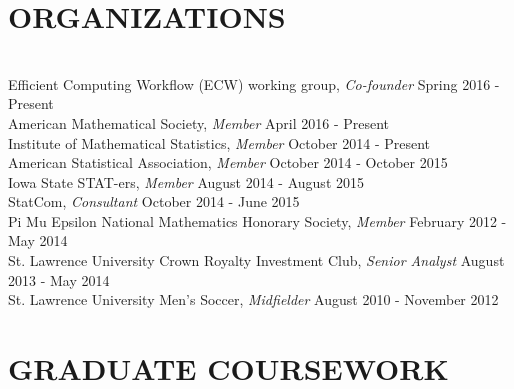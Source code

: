 \documentclass{res} %
\begin{document}
\begin{resume}

\section{ORGANIZATIONS}

\hrulefill \\
Efficient Computing Workflow (ECW) working group, {\sl Co-founder} \dotfill Spring 2016 - Present \\
American Mathematical Society, {\sl Member} \dotfill April 2016 - Present \\
Institute of Mathematical Statistics, {\sl Member} \dotfill October 2014 - Present \\
American Statistical Association, {\sl Member} \dotfill October 2014 - October 2015 \\
Iowa State STAT-ers, {\sl Member} \dotfill August 2014 - August 2015 \\
StatCom, {\sl Consultant} \dotfill October 2014 - June 2015\\
Pi Mu Epsilon National Mathematics Honorary Society, {\sl Member} \dotfill February 2012 - May 2014 \\
St. Lawrence University Crown Royalty Investment Club, {\sl Senior Analyst} \dotfill August 2013 - May 2014 \\
St. Lawrence University Men's Soccer, {\sl Midfielder} \dotfill August 2010 - November 2012 


\section{GRADUATE COURSEWORK}


\end{resume}
\end{document}
